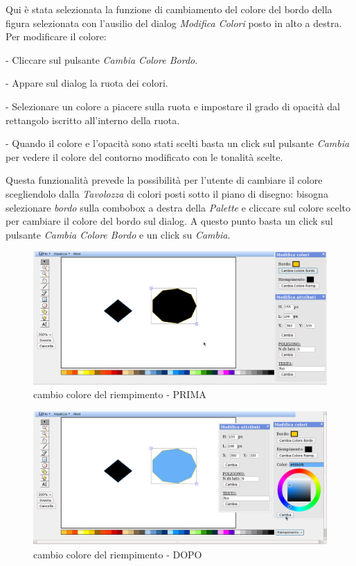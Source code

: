 \vspace{100pt}
Qui \`e stata selezionata la funzione di cambiamento del colore del bordo della figura selezionata con l'ausilio del dialog \textit{Modifica Colori} posto in alto a destra. Per modificare il colore: 
\begin{elencopuntato}[\normindent]
\item[-] Cliccare sul pulsante \textit{Cambia Colore Bordo}.
\item[-] Appare sul dialog la ruota dei colori.
\item[-] Selezionare un colore a piacere sulla ruota e impostare il grado di opacit\`a dal rettangolo iscritto all'interno della ruota. 
\item[-]Quando il colore e l'opacit\`a sono stati scelti basta un click sul pulsante \textit{Cambia} per vedere il colore del contorno modificato con le tonalit\`a scelte. 
\end{elencopuntato}
Questa funzionalit\`a prevede la possibilit\`a per l'utente di cambiare il colore scegliendolo dalla \textit{Tavolozza} di colori posti sotto il piano di disegno: bisogna selezionare \textit{bordo} sulla combobox a destra della \textit{Palette} e cliccare sul colore scelto per cambiare il colore del bordo sul dialog. A questo punto basta un click sul pulsante \textit{Cambia Colore Bordo} e un click su \textit{Cambia}.

\begin{figure}[!ht]
\centering
\includegraphics[scale=0.4]{images/colore_riempimento_prima.png}
\caption{cambio colore del riempimento  - PRIMA}
\end{figure} 

\begin{figure}[!ht]
\centering
\includegraphics[scale=0.4]{images/colore_riempimento_dopo.png}
\caption{cambio colore del riempimento  - DOPO}
\end{figure} 


